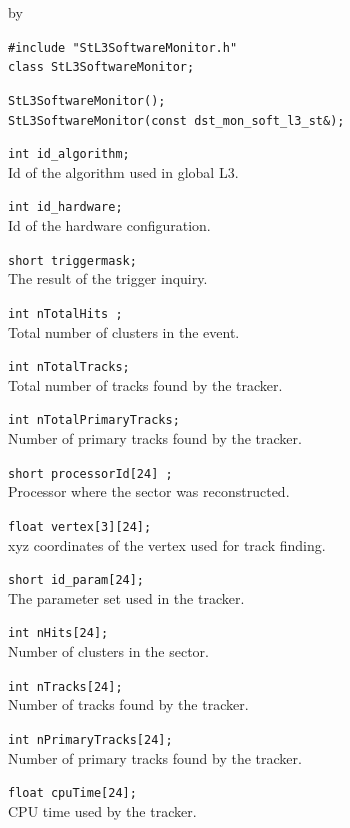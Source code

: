 \documentclass[twoside]{article}
\newcommand{\entrylabel}[1]{\mbox{\textbf{{#1}}}\hfil}%
\newenvironment{entry}
{\begin{list}{}%
    {\renewcommand{\makelabel}{\entrylabel}%
     \setlength{\labelwidth}{90pt}%
     \setlength{\leftmargin}{\labelwidth}
     \advance\leftmargin by \labelsep%
      }%
    }%
  {\end{list}}
\newcommand{\Entrylabel}[1]%
{\raisebox{0pt}[1ex][0pt]{\makebox[\labelwidth][l]%
    {\parbox[t]{\labelwidth}{\hspace{0pt}\textbf{{#1}}}}}}
\newenvironment{Entry}%
{\renewcommand{\entrylabel}{\Entrylabel}\begin{entry}}%
  {\end{entry}}
\begin{document}
\begin{Entry}
\item[Summary]
\item[Synopsis]
    \verb+#include "StL3SoftwareMonitor.h"+\\
    \verb+class StL3SoftwareMonitor;+\\
\item[Description]
\item[Related Classes]
\item[Public\\ Constructors]
    \verb+StL3SoftwareMonitor();+\\
    \verb+StL3SoftwareMonitor(const dst_mon_soft_l3_st&);+\\
\item[Public Data\\ Member]
    \verb+int id_algorithm;+\\
    Id of the algorithm used in global L3.
    
    \verb+int id_hardware;+\\
    Id of the hardware configuration.
    
    \verb+short triggermask;+\\
    The result of the trigger inquiry.
    
    \verb+int nTotalHits ;+\\
    Total number of clusters in the event.
    
    \verb+int nTotalTracks;+\\
    Total number of tracks found by the tracker.
    
    \verb+int nTotalPrimaryTracks;+\\
    Number of primary tracks found by the tracker.
    
    \verb+short processorId[24] ;+\\
    Processor where the sector was reconstructed.
    
    \verb+float vertex[3][24];+\\
    xyz coordinates of the vertex used for track finding.
    
    \verb+short id_param[24];+\\
    The parameter set used in the tracker.
    
    \verb+int nHits[24];+\\
    Number of clusters in the sector.
    
    \verb+int nTracks[24];+\\
    Number of tracks found by the tracker.
    
    \verb+int nPrimaryTracks[24];+\\
    Number of primary tracks found by the tracker.
    
    \verb+float cpuTime[24];+\\
    CPU time used by the tracker.
\end{Entry}
\clearpage
\end{document}
